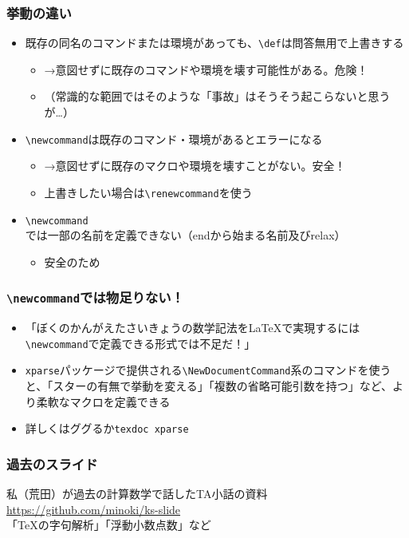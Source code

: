 \documentclass[aspectratio=169]{beamer}
\newcommand\cmdname[1]{\texttt{\textbackslash #1}}
\begin{document}
\begin{frame}\frametitle{挙動の違い}
  \begin{itemize}
  \item 既存の同名のコマンドまたは環境があっても、\cmdname{def}は問答無用で上書きする
    \begin{itemize}
    \item →意図せずに既存のコマンドや環境を壊す可能性がある。危険！
    \item （常識的な範囲ではそのような「事故」はそうそう起こらないと思うが…）
    \end{itemize}
  \item \cmdname{newcommand}は既存のコマンド・環境があるとエラーになる
    \begin{itemize}
    \item →意図せずに既存のマクロや環境を壊すことがない。安全！
    \item 上書きしたい場合は\cmdname{renewcommand}を使う
    \end{itemize}
  \item \cmdname{newcommand}では一部の名前を定義できない（endから始まる名前及びrelax）
    \begin{itemize}
    \item 安全のため
    \end{itemize}
  \end{itemize}
\end{frame}
\begin{frame}\frametitle{\cmdname{newcommand}では物足りない！}
  \begin{itemize}
    \item 「ぼくのかんがえたさいきょうの数学記法を\LaTeX で実現するには\cmdname{newcommand}で定義できる形式では不足だ！」
    \item \texttt{xparse}パッケージで提供される\cmdname{NewDocumentCommand}系のコマンドを使うと、「スターの有無で挙動を変える」「複数の省略可能引数を持つ」など、より柔軟なマクロを定義できる
    \item 詳しくはググるか\texttt{texdoc xparse}
  \end{itemize}
\end{frame}
\begin{frame}[plain]\frametitle{過去のスライド}
  \centering
  私（荒田）が過去の計算数学で話したTA小話の資料\\
  \url{https://github.com/minoki/ks-slide}\\
  「\TeX の字句解析」「浮動小数点数」など
\end{frame}
\end{document}
